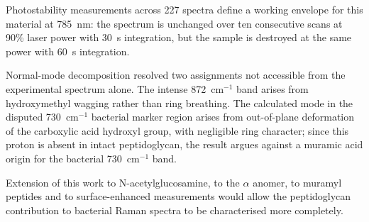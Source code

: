 \documentclass[11pt,a4paper]{article}
\newcommand{\wn}{\ensuremath{\mathrm{cm}^{-1}}}
\begin{document}
Photostability measurements across 227 spectra define a working envelope for
this material at 785~nm: the spectrum is unchanged over ten consecutive scans at
90\% laser power with 30~s integration, but the sample is destroyed at the same
power with 60~s integration.

Normal-mode decomposition resolved two assignments not accessible from the
experimental spectrum alone. The intense 872~\wn{} band arises from
hydroxymethyl wagging rather than ring breathing. The calculated mode in the
disputed 730~\wn{} bacterial marker region arises from out-of-plane deformation
of the carboxylic acid hydroxyl group, with negligible ring character; since
this proton is absent in intact peptidoglycan, the result argues against a
muramic acid origin for the bacterial 730~\wn{} band.

Extension of this work to N-acetylglucosamine, to the $\alpha$ anomer, to
muramyl peptides and to surface-enhanced measurements would allow the
peptidoglycan contribution to bacterial Raman spectra to be characterised more
completely.
\end{document}

